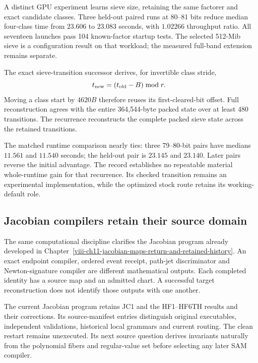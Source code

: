 A distinct GPU experiment learns sieve size, retaining
the same factorer and exact candidate classes.
Three held-out paired runs at 80--81 bits reduce
median four-class time from \(23.606\) to \(23.083\)
seconds, with \(1.02266\) throughput ratio.
All seventeen launches pass 104 known-factor startup
tests. The selected 512-Mib sieve is a configuration
result on that workload; the measured full-band
extension remains separate.

The exact sieve-transition successor derives, for
invertible class stride,
\[
 t_{\rm new}=(t_{\rm old}-B)\bmod r.
\]
Moving a class start by \(4620B\) therefore reuses its
first-cleared-bit offset. Full reconstruction agrees
with the entire 364,544-byte packed state over at least
480 transitions. The recurrence reconstructs the complete packed sieve state across the retained transitions.

The matched runtime comparison nearly ties: three
79--80-bit pairs have medians \(11.561\) and
\(11.540\) seconds; the held-out pair is \(23.145\)
and \(23.140\). Later pairs reverse the initial
advantage. The record establishes no repeatable
material whole-runtime gain for that recurrence.
Its checked transition remains an experimental
implementation, while the optimized stock route
retains its working-default role.

\subsection{Jacobian compilers retain their source domain}

The same computational discipline clarifies the
Jacobian program already developed in
Chapter~\ref{viii-ch11-jacobian-maps-return-and-retained-history}.
An exact endpoint compiler, ordered event receipt,
path-jet discriminator and Newton-signature compiler
are different mathematical outputs. Each completed
identity has a source map and an admitted chart.
A successful target reconstruction does not identify
those outputs with one another.

The current Jacobian program retains JC1 and the
HF1--HF6TH results and their corrections. Its
source-manifest entries distinguish original
executables, independent validations, historical
local grammars and current routing. The clean
restart remains unexecuted. Its next source
question derives invariants naturally from the
polynomial fibers and regular-value set before
selecting any later SAM compiler.

